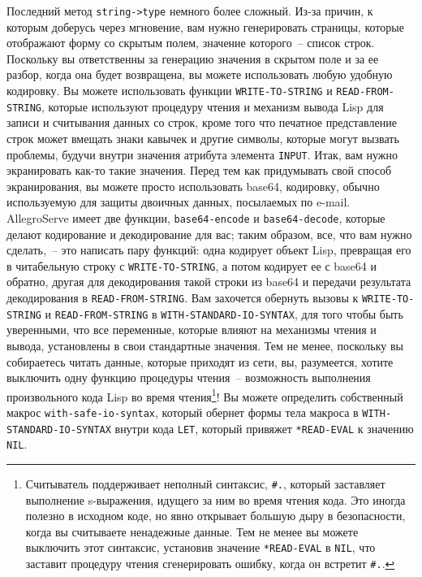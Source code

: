 Последний метод \lstinline{string->type}  немного более сложный. Из-за причин, к которым доберусь
через мгновение, вам нужно генерировать страницы, которые отображают форму со скрытым
полем, значение которого~-- список строк. Поскольку вы ответственны за генерацию значения в
скрытом поле и за ее разбор, когда она будет возвращена, вы можете использовать любую
удобную кодировку. Вы можете использовать функции \lstinline{WRITE-TO-STRING} и
\lstinline{READ-FROM-STRING}, которые используют процедуру чтения и механизм вывода Lisp для записи
и считывания данных со строк, кроме того что печатное представление строк может вмещать
знаки кавычек и другие символы, которые могут вызвать проблемы, будучи внутри значения
атрибута элемента \lstinline{INPUT}. Итак, вам нужно экранировать как-то такие значения. Перед
тем как придумывать свой способ экранирования, вы можете просто использовать base64,
кодировку, обычно используемую для защиты двоичных данных, посылаемых по e-mail. AllegroServe
имеет две функции, \lstinline{base64-encode} и \lstinline{base64-decode}, которые делают кодирование
и декодирование для вас; таким образом, все, что вам нужно сделать,~-- это написать пару
функций: одна кодирует объект Lisp, превращая его в читабельную строку с
\lstinline{WRITE-TO-STRING}, а потом кодирует ее с base64 и обратно, другая для декодирования
такой строки из base64 и передачи результата декодирования в \lstinline{READ-FROM-STRING}. Вам
захочется обернуть вызовы к \lstinline{WRITE-TO-STRING} и \lstinline{READ-FROM-STRING} в
\lstinline{WITH-STANDARD-IO-SYNTAX}, для того чтобы быть уверенными, что все переменные, которые
влияют на механизмы чтения и вывода, установлены в свои стандартные значения. Тем не менее,
поскольку вы собираетесь читать данные, которые приходят из сети, вы, разумеется, хотите
выключить одну функцию процедуры чтения~-- возможность выполнения произвольного кода Lisp во
время чтения\footnote{Считыватель поддерживает неполный синтаксис, \lstinline!#.!,
который заставляет выполнение s-выражения, идущего за ним во время чтения кода. Это иногда
полезно в исходном коде, но явно открывает большую дыру в безопасности, когда вы считываете
ненадежные данные. Тем не менее вы можете выключить этот синтаксис, установив значение
\lstinline{*READ-EVAL} в \lstinline{NIL}, что заставит процедуру чтения сгенерировать ошибку, когда он
встретит \lstinline!#.!.}! Вы можете определить собственный макрос
\lstinline{with-safe-io-syntax}, который обернет формы тела макроса в
\lstinline{WITH-STANDARD-IO-SYNTAX} внутри кода \lstinline{LET}, который привяжет \lstinline{*READ-EVAL} к
значению \lstinline{NIL}.

